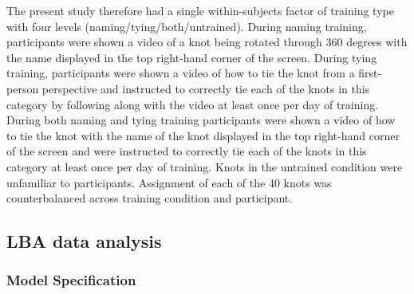 \documentclass[
  man, donotrepeattitle,floatsintext]{apa6}
\begin{document}
The present study therefore had a single within-subjects factor of training type with four levels (naming/tying/both/untrained). During naming training, participants were shown a video of a knot being rotated through 360 degrees with the name displayed in the top right-hand corner of the screen. During tying training, participants were shown a video of how to tie the knot from a first-person perspective and instructed to correctly tie each of the knots in this category by following along with the video at least once per day of training. During both naming and tying training participants were shown a video of how to tie the knot with the name of the knot displayed in the top right-hand corner of the screen and were instructed to correctly tie each of the knots in this category at least once per day of training. Knots in the untrained condition were unfamiliar to participants. Assignment of each of the 40 knots was counterbalanced across training condition and participant.

\subsection{LBA data analysis}\label{lba-data-analysis}

\subsubsection{Model Specification}\label{model-specification}
\end{document}
